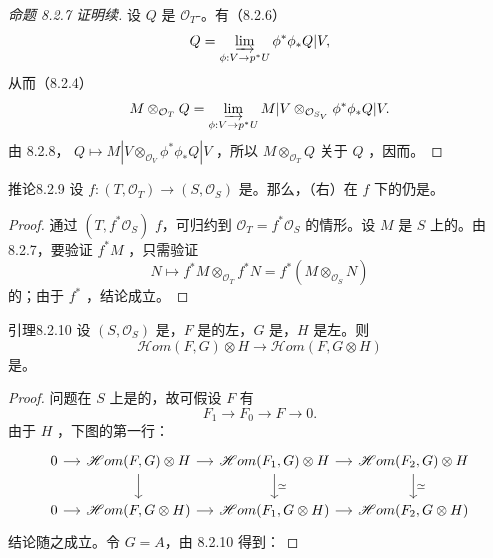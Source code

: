 \begin{proof}[命题 8.2.7 证明续]
设 $Q$ 是 $\mathcal O_T$-。有（8.2.6）
\[Q=\varinjlim_{\phi:V\to p^*U}\phi^*\phi_*Q|V,\]
从而（8.2.4）
\[M\otimes_{\mathcal O_T}Q=\varinjlim_{\phi:V\to p^*U}M|V\otimes_{\mathcal O_{S_V}}\phi^*\phi_*Q|V.\]
由 8.2.8， $Q\mapsto M|V\otimes_{\mathcal O_V}\phi^*\phi_*Q|V$ ，所以 $M\otimes_{\mathcal O_T}Q$ 关于 $Q$ ，因而。
\end{proof}
\begin{SGAresult}{推论}{8.2.9}
设 $f:(T,\mathcal O_T)\to(S,\mathcal O_S)$ 是。那么，（右）在 $f$ 下的仍是。
\end{SGAresult}
\begin{proof}
通过 $(T,f^*\mathcal O_S)$  $f$，可归约到 $\mathcal O_T=f^*\mathcal O_S$ 的情形。设 $M$ 是 $S$ 上的。由 8.2.7，要验证 $f^*M$ ，只需验证
\[N\longmapsto f^*M\otimes_{\mathcal O_T}f^*N=f^*(M\otimes_{\mathcal O_S}N)\]
的；由于 $f^*$ ，结论成立。
\end{proof}
\begin{SGAresult}{引理}{8.2.10}
设 $(S,\mathcal O_S)$ 是，$F$ 是的左，$G$ 是，$H$ 是左。则
\[\mathscr Hom(F,G)\otimes H\longrightarrow\mathscr Hom(F,G\otimes H)\]
是。
\end{SGAresult}
\begin{proof}
问题在 $S$ 上是的，故可假设 $F$ 有
\[F_1\longrightarrow F_0\longrightarrow F\longrightarrow0.\]
由于 $H$ ，下图的第一行：
\[\begin{tikzcd}[column sep=small]
0\arrow[r]&\mathscr Hom(F,G)\otimes H\arrow[r]\arrow[d]&\mathscr Hom(F_1,G)\otimes H\arrow[r]\arrow[d,"\simeq"]&\mathscr Hom(F_2,G)\otimes H\arrow[d,"\simeq"]\\
0\arrow[r]&\mathscr Hom(F,G\otimes H)\arrow[r]&\mathscr Hom(F_1,G\otimes H)\arrow[r]&\mathscr Hom(F_2,G\otimes H)
\end{tikzcd}\]
结论随之成立。令 $G=A$，由 8.2.10 得到：
\end{proof}
